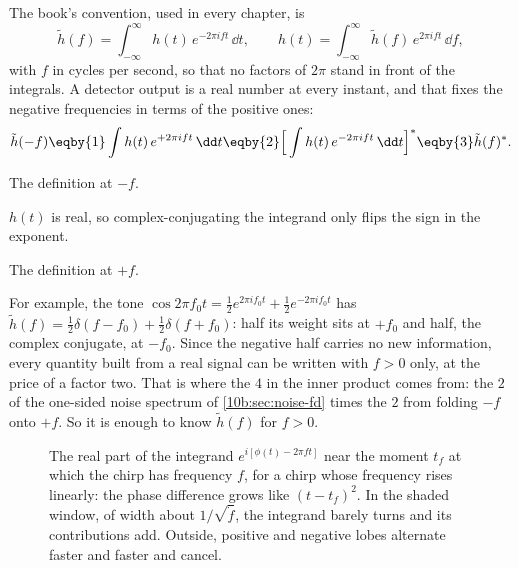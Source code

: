 The book's convention, used in every chapter, is
\begin{equation}
  \tilde h(f)=\int_{-\infty}^{\infty}h(t)\,e^{-2\pi ift}\,\dd t,\qquad
  h(t)=\int_{-\infty}^{\infty}\tilde h(f)\,e^{2\pi ift}\,\dd f ,
  \label{T2g:eq:fourier}
\end{equation}
with $f$ in cycles per second, so that no factors of $2\pi$ stand in front of the integrals. A detector output is a real number at every instant, and that fixes the negative frequencies in terms of the positive ones:
\begin{equation}
  \tilde h(-f)\eqby{1}\int h(t)\,e^{+2\pi ift}\,\dd t\eqby{2}\Big[\int h(t)\,e^{-2\pi ift}\,\dd t\Big]^*\eqby{3}\tilde h(f)^* .
  \label{T2g:eq:reality}
\end{equation}
\begin{explain}
  \item The definition at $-f$.
  \item $h(t)$ is real, so complex-conjugating the integrand only flips the sign in the exponent.
  \item The definition at $+f$.
\end{explain}
For example, the tone $\cos2\pi f_0t=\tfrac12e^{2\pi if_0t}+\tfrac12e^{-2\pi if_0t}$ has $\tilde h(f)=\tfrac12\delta(f-f_0)+\tfrac12\delta(f+f_0)$: half its weight sits at $+f_0$ and half, the complex conjugate, at $-f_0$. Since the negative half carries no new information, every quantity built from a real signal can be written with $f>0$ only, at the price of a factor two. That is where the $4$ in the inner product comes from: the $2$ of the one-sided noise spectrum of \cref{10b:sec:noise-fd} times the $2$ from folding $-f$ onto $+f$. So it is enough to know $\tilde h(f)$ for $f>0$.

\begin{figure}[htbp]
\centering
{}
\caption{The real part of the integrand $e^{i[\phi(t)-2\pi ft]}$ near the moment $t_f$ at which the chirp has frequency $f$, for a chirp whose frequency rises linearly: the phase difference grows like $(t-t_f)^2$. In the shaded window, of width about $1/\sqrt{\dot f}$, the integrand barely turns and its contributions add. Outside, positive and negative lobes alternate faster and faster and cancel.}
\label{T2a:fig:spa-picture}
\end{figure}

